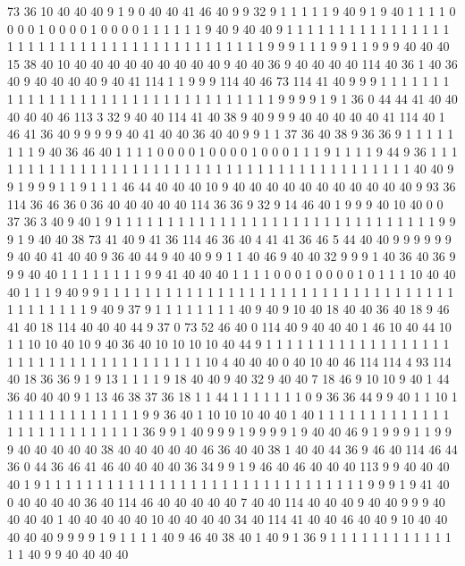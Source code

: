 73 36 10 40 40 40 9 1 9 0 40 40 41 46 40 9 9 32 9 1
1 1 1 1 9 40 9 1 9 40 1 1 1 1 0 0 0 0 1 0
0 0 0 1 0 0 0 0 1 1 1 1 1 1 9 40 9 40 40 9
1 1 1 1 1 1 1 1 1 1 1 1 1 1 1 1 1 1 1 1
1 1 1 1 1 1 1 1 1 1 1 1 1 1 1 1 1 1 1 1
1 9 9 9 1 1 1 9 9 1 1 9 9 9 40 40 40 15 38 40
10 40 40 40 40 40 40 40 40 40 9 40 40 36 9 40 40 40 40 114
40 36 1 40 36 40 9 40 40 40 40 9 40 41 114 1 1 9 9 9
114 40 46 73 114 41 40 9 9 9 1 1 1 1 1 1 1 1 1 1
1 1 1 1 1 1 1 1 1 1 1 1 1 1 1 1 1 1 1 1
1 1 1 9 9 9 9 1 9 1 36 0 44 44 41 40 40 40 40 40
46 113 3 32 9 40 40 114 41 40 38 9 40 9 9 9 40 40 40 40
40 41 114 40 1 46 41 36 40 9 9 9 9 9 40 41 40 40 36 40
40 9 9 1 1 37 36 40 38 9 36 36 9 1 1 1 1 1 1 1
1 9 40 36 46 40 1 1 1 1 0 0 0 0 1 0 0 0 0 1
0 0 0 1 1 1 9 1 1 1 1 9 44 9 36 1 1 1 1 1
1 1 1 1 1 1 1 1 1 1 1 1 1 1 1 1 1 1 1 1
1 1 1 1 1 1 1 1 1 1 1 1 1 1 1 1 1 40 40 9
9 1 9 9 9 1 1 9 1 1 1 46 44 40 40 40 10 9 40 40
40 40 40 40 40 40 40 40 40 9 93 36 114 36 46 36 0 36 40 40
40 40 40 114 36 36 9 32 9 14 46 40 1 9 9 9 40 10 40 0
0 37 36 3 40 9 40 1 9 1 1 1 1 1 1 1 1 1 1 1
1 1 1 1 1 1 1 1 1 1 1 1 1 1 1 1 1 1 1 1
9 9 9 1 9 40 40 38 73 41 40 9 41 36 114 46 36 40 4 41
41 36 46 5 44 40 40 9 9 9 9 9 9 9 40 40 41 40 40 9
36 40 44 9 40 40 9 9 1 1 40 46 9 40 40 32 9 9 9 1
40 36 40 36 9 9 9 40 40 1 1 1 1 1 1 1 1 9 9 41
40 40 40 1 1 1 1 0 0 0 1 0 0 0 0 1 0 1 1 1
10 40 40 40 1 1 1 9 40 9 9 1 1 1 1 1 1 1 1 1
1 1 1 1 1 1 1 1 1 1 1 1 1 1 1 1 1 1 1 1
1 1 1 1 1 1 1 1 1 1 1 1 1 9 40 9 37 9 1 1
1 1 1 1 1 1 40 9 40 9 10 40 18 40 40 36 40 18 9 46
41 40 18 114 40 40 40 44 9 37 0 73 52 46 40 0 114 40 9 40
40 40 1 46 10 40 44 10 1 1 10 10 40 10 9 40 36 40 10 10
10 10 40 44 9 1 1 1 1 1 1 1 1 1 1 1 1 1 1 1
1 1 1 1 1 1 1 1 1 1 1 1 1 1 1 1 1 1 1 1
1 1 10 4 40 40 40 0 40 10 40 46 114 114 4 93 114 40 18 36
36 9 1 9 13 1 1 1 1 9 18 40 40 9 40 32 9 40 40 7
18 46 9 10 10 9 40 1 44 36 40 40 40 9 1 13 46 38 37 36
18 1 1 44 1 1 1 1 1 1 1 0 9 36 36 44 9 9 40 1
1 10 1 1 1 1 1 1 1 1 1 1 1 1 1 1 9 9 36 40
1 10 10 10 40 40 1 40 1 1 1 1 1 1 1 1 1 1 1 1
1 1 1 1 1 1 1 1 1 1 1 1 1 1 36 9 9 1 40 9
9 9 1 9 9 9 9 1 9 40 40 46 9 1 9 9 9 1 1 9
9 9 40 40 40 40 40 38 40 40 40 40 40 46 36 40 40 38 1 40
40 44 36 9 46 40 114 46 44 36 0 44 36 46 41 46 40 40 40 40
36 34 9 9 1 9 46 40 46 40 40 40 113 9 9 40 40 40 40 1
9 1 1 1 1 1 1 1 1 1 1 1 1 1 1 1 1 1 1 1
1 1 1 1 1 1 1 1 1 1 1 1 9 9 9 1 9 41 40 0
40 40 40 40 36 40 114 46 40 40 40 40 40 7 40 40 114 40 40 40
9 40 40 9 9 9 40 40 40 40 1 40 40 40 40 40 10 40 40 40
40 34 40 114 41 40 40 46 40 40 9 10 40 40 40 40 40 9 9 9
9 1 9 1 1 1 1 40 9 46 40 38 40 1 40 9 1 36 9 1
1 1 1 1 1 1 1 1 1 1 1 1 1 40 9 9 40 40 40 40
